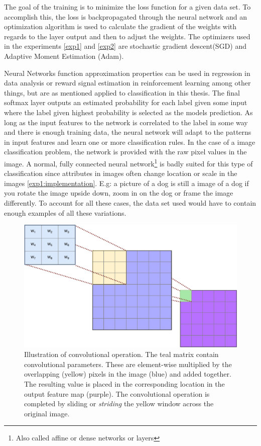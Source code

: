 The goal of the training is to minimize the loss function for a given data set. To accomplish this, the loss is backpropagated through the neural network and an optimization algorithm is used to calculate the gradient of the weights with regards to the layer output and then to adjust the weights. The optimizers used in the experiments \ref{exp1} and \ref{exp2} are stochastic gradient descent(SGD)\cite{sgd} and Adaptive Moment Estimation (Adam)\cite{adam}. 

Neural Networks function approximation properties can be used in regression in data analysis or reward signal estimation in reinforcement learning among other things, but are as mentioned applied to classification in this thesis. 
The final softmax layer outputs an estimated probability for each label given some input where the label given highest probability is selected as the models prediction. As long as the input features to the network is correlated to the label in some way and there is enough training data, the neural network will adapt to the patterns in input features and learn one or more classification rules. In the case of a image classification problem, the network is provided with the raw pixel values in the image. A normal, fully connected neural network\footnote{Also called affine or dense networks or layers} is badly suited for this type of classification since attributes in images often change location or scale in the images \ref{exp1:implementation}. E.g: a picture of a dog is still a image of a dog if you rotate the image upside down, zoom in on the dog or frame the image differently. To account for all these cases, the data set used would have to contain enough examples of all these variations.
\begin{figure}[ht] 
    \centering
    \includegraphics[width=\linewidth]{Chapters/2.Background/figures/convolution.pdf}
    \caption[Illustration of convolutional operation.]{Illustration of convolutional operation. The teal matrix contain convolutional parameters. These are element-wise multiplied by the overlapping (yellow) pixels in the image (blue) and added together. The resulting value is placed in the corresponding location in the output feature map (purple). The convolutional operation is completed by sliding or \textit{striding} the yellow window across the original image.}
    \label{fig:conv}
\end{figure}
